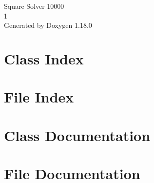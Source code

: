 \documentclass[twoside]{book}
\newcommand{\+}{\discretionary{\mbox{\scriptsize$\hookleftarrow$}}{}{}}
\newcommand{\clearemptydoublepage}{%
    \newpage{\pagestyle{empty}\cleardoublepage}%
  }
\begin{document}
  \raggedbottom
    \hypersetup{pageanchor=false,
                bookmarksnumbered=true,
                pdfencoding=unicode
               }
  \begin{titlepage}
  \vspace*{7cm}
  \begin{center}%
  {\Large Square Solver 10000}\\
  [1ex]\large 1 \\
  \vspace*{1cm}
  {\large Generated by Doxygen 1.18.0}\\
  \end{center}
  \end{titlepage}
  \clearemptydoublepage
  \tableofcontents
  \clearemptydoublepage
  \hypersetup{pageanchor=true}

\chapter{Class Index}

\chapter{File Index}

\chapter{Class Documentation}



\chapter{File Documentation}























  \backmatter
  \newpage
  \clearemptydoublepage
  \printindex
\end{document}
